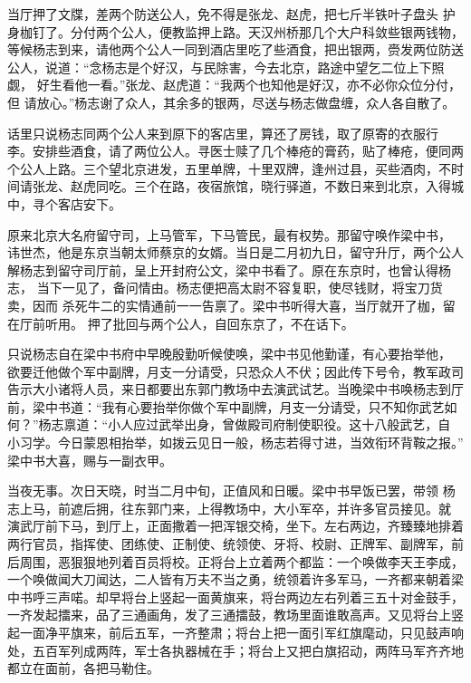 当厅押了文牒，差两个防送公人，免不得是张龙、赵虎，把七斤半铁叶子盘头
护身枷钉了。分付两个公人，便教监押上路。天汉州桥那几个大户科敛些银两钱物，
等候杨志到来，请他两个公人一同到酒店里吃了些酒食，把出银两，赍发两位防送
公人，说道：“念杨志是个好汉，与民除害，今去北京，路途中望乞二位上下照觑，
好生看他一看。”张龙、赵虎道：“我两个也知他是好汉，亦不必你众位分付，但
请放心。”杨志谢了众人，其余多的银两，尽送与杨志做盘缠，众人各自散了。

话里只说杨志同两个公人来到原下的客店里，算还了房钱，取了原寄的衣服行
李。安排些酒食，请了两位公人。寻医士赎了几个棒疮的膏药，贴了棒疮，便同两
个公人上路。三个望北京进发，五里单牌，十里双牌，逢州过县，买些酒肉，不时
间请张龙、赵虎同吃。三个在路，夜宿旅馆，晓行驿道，不数日来到北京，入得城
中，寻个客店安下。

原来北京大名府留守司，上马管军，下马管民，最有权势。那留守唤作梁中书，
讳世杰，他是东京当朝太师蔡京的女婿。当日是二月初九日，留守升厅，两个公人
解杨志到留守司厅前，呈上开封府公文，梁中书看了。原在东京时，也曾认得杨志，
当下一见了，备问情由。杨志便把高太尉不容复职，使尽钱财，将宝刀货卖，因而
杀死牛二的实情通前一一告禀了。梁中书听得大喜，当厅就开了枷，留在厅前听用。
押了批回与两个公人，自回东京了，不在话下。

只说杨志自在梁中书府中早晚殷勤听候使唤，梁中书见他勤谨，有心要抬举他，
欲要迁他做个军中副牌，月支一分请受，只恐众人不伏；因此传下号令，教军政司
告示大小诸将人员，来日都要出东郭门教场中去演武试艺。当晚梁中书唤杨志到厅
前，梁中书道：“我有心要抬举你做个军中副牌，月支一分请受，只不知你武艺如
何？”杨志禀道：“小人应过武举出身，曾做殿司府制使职役。这十八般武艺，自
小习学。今日蒙恩相抬举，如拨云见日一般，杨志若得寸进，当效衔环背鞍之报。”
梁中书大喜，赐与一副衣甲。

当夜无事。次日天晓，时当二月中旬，正值风和日暖。梁中书早饭已罢，带领
杨志上马，前遮后拥，往东郭门来，上得教场中，大小军卒，并许多官员接见。就
演武厅前下马，到厅上，正面撒着一把浑银交椅，坐下。左右两边，齐臻臻地排着
两行官员，指挥使、团练使、正制使、统领使、牙将、校尉、正牌军、副牌军，前
后周围，恶狠狠地列着百员将校。正将台上立着两个都监：一个唤做李天王李成，
一个唤做闻大刀闻达，二人皆有万夫不当之勇，统领着许多军马，一齐都来朝着梁
中书呼三声喏。却早将台上竖起一面黄旗来，将台两边左右列着三五十对金鼓手，
一齐发起擂来，品了三通画角，发了三通擂鼓，教场里面谁敢高声。又见将台上竖
起一面净平旗来，前后五军，一齐整肃；将台上把一面引军红旗麾动，只见鼓声响
处，五百军列成两阵，军士各执器械在手；将台上又把白旗招动，两阵马军齐齐地
都立在面前，各把马勒住。

